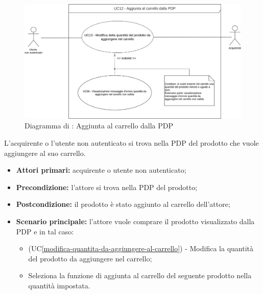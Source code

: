 
\label{aggiunta-carrello-pdp}

\begin{figure}[H]
    \centering
    \includegraphics[scale=0.6]{Immagini/DiagrammiUC/AggiuntaProdottiCarrelloPDP.png}
    \caption{Diagramma di \actualUC: Aggiunta al carrello dalla PDP}
    \label{fig:aggiunta-carrello-pdp}
\end{figure}

L'acquirente o l'utente non autenticato si trova nella PDP del prodotto che vuole aggiungere al suo carrello.
\begin{itemize}
    \item \textbf{Attori primari:} acquirente o utente non autenticato;
    \item \textbf{Precondizione:} l'attore si trova nella PDP del prodotto;
    \item \textbf{Postcondizione:} il prodotto è stato aggiunto al carrello dell'attore;
    \item \textbf{Scenario principale:} l'attore vuole comprare il prodotto visualizzato dalla PDP e in tal caso:
    \begin{itemize}
        \item (UC\ref{modifica-quantita-da-aggiungere-al-carrello}) - Modifica la quantità del prodotto da aggiungere nel carrello;
        \item Seleziona la funzione di aggiunta al carrello del seguente prodotto nella quantità impostata.
    \end{itemize}
\end{itemize}


